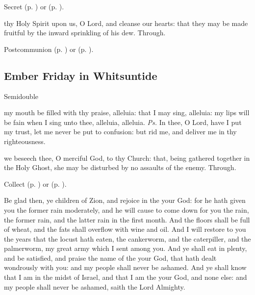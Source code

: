 
\begin{rubric}
     Secret  (p. \pageref{SPAgainst}) or  (p. \pageref{SPChiefBishop}).
\end{rubric}

\postcommunion
{} thy Holy Spirit upon us, O Lord, and cleanse our hearts: that they may be made fruitful by the inward sprinkling of his dew. Through.


\begin{rubric}
     Postcommunion  (p. \pageref{SPAgainst}) or  (p. \pageref{SPChiefBishop}).
\end{rubric}


\subsection{Ember Friday in Whitsuntide}
\begin{inhead}
    {Semidouble}
\end{inhead}

\introit
{} my mouth be filled with thy praise, alleluia: that I may sing, alleluia: my lips will be fain when I sing unto thee, alleluia, alleluia. \textit{Ps.} In thee, O Lord, have I put my trust, let me never be put to confusion: but rid me, and deliver me in thy righteousness.

\collect
{} we beseech thee, O merciful God, to thy Church: that, being gathered together in the Holy Ghost, she may be disturbed by no assaults of the enemy. Through.
\begin{rubric}
     Collect  (p. \pageref{SPAgainst}) or  (p. \pageref{SPChiefBishop}).
\end{rubric}

 Be glad then, ye children of Zion, and rejoice in the  your God: for he hath given you the former rain moderately, and he will cause to come down for you the rain, the former rain, and the latter rain in the first month. And the floors shall be full of wheat, and the fats shall overflow with wine and oil. And I will restore to you the years that the locust hath eaten, the cankerworm, and the caterpiller, and the palmerworm, my great army which I sent among you. And ye shall eat in plenty, and be satisfied, and praise the name of the  your God, that hath dealt wondrously with you: and my people shall never be ashamed. And ye shall know that I am in the midst of Israel, and that I am the  your God, and none else: and my people shall never be ashamed, saith the Lord Almighty.

